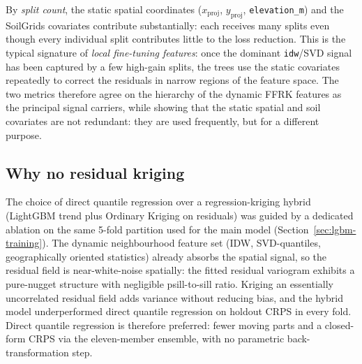 By \emph{split count}, the static spatial coordinates
($x_{\mathrm{proj}}$, $y_{\mathrm{proj}}$, \texttt{elevation\_m}) and the
SoilGrids covariates contribute substantially: each receives many splits
even though every individual split contributes little to the loss
reduction. This is the typical signature of \emph{local fine-tuning
features}: once the dominant \texttt{idw}/SVD signal has been captured by
a few high-gain splits, the trees use the static covariates repeatedly to
correct the residuals in narrow regions of the feature space. The two
metrics therefore agree on the hierarchy of the dynamic FFRK features as
the principal signal carriers, while showing that the static spatial and
soil covariates are not redundant: they are used frequently, but for a
different purpose.

\subsection{Why no residual kriging}
\label{sec:lgbm-rk-ablation}

The choice of direct quantile regression over a regression-kriging
hybrid (LightGBM trend plus Ordinary Kriging on residuals) was
guided by a dedicated ablation on the same 5-fold partition used for
the main model (Section~\ref{sec:lgbm-training}). The dynamic
neighbourhood feature set (IDW, SVD-quantiles, geographically
oriented statistics) already absorbs the spatial signal, so the
residual field is near-white-noise spatially: the fitted residual
variogram exhibits a pure-nugget structure with negligible
psill-to-sill ratio. Kriging an essentially uncorrelated residual
field adds variance without reducing bias, and the hybrid model
underperformed direct quantile regression on holdout CRPS in every
fold. Direct quantile regression is therefore preferred: fewer
moving parts and a closed-form CRPS via the eleven-member ensemble,
with no parametric back-transformation step.
